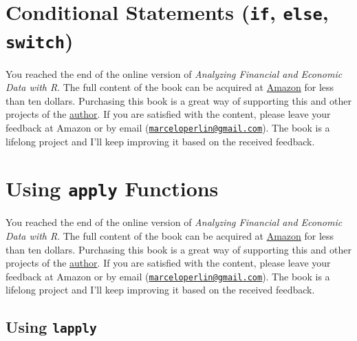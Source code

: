 \documentclass[
  12pt,
]{book}
\newenvironment{pleasebuyit}
{\begin{noteblock}
		
	} {\end{noteblock}}
\begin{document}
\hypertarget{conditional-statements-if-else-switch}{%
\section{\texorpdfstring{Conditional Statements (\texttt{if}, \texttt{else}, \texttt{switch})}{Conditional Statements (if, else, switch)}}\label{conditional-statements-if-else-switch}}

\begin{pleasebuyit}
You reached the end of the online version of \emph{Analyzing Financial
and Economic Data with R}. The full content of the book can be acquired
at \href{https://www.amazon.com/dp/B084LSNXMN}{Amazon} for less than ten
dollars. Purchasing this book is a great way of supporting this and
other projects of the \href{https://www.msperlin.com/blog/}{author}. If
you are satisfied with the content, please leave your feedback at Amazon
or by email
(\href{mailto:marceloperlin@gmail.com}{\nolinkurl{marceloperlin@gmail.com}}).
The book is a lifelong project and I'll keep improving it based on the
received feedback.
\end{pleasebuyit}

\hypertarget{using-apply-functions}{%
\section{\texorpdfstring{Using \texttt{apply} Functions}{Using apply Functions}}\label{using-apply-functions}}

\begin{pleasebuyit}
You reached the end of the online version of \emph{Analyzing Financial
and Economic Data with R}. The full content of the book can be acquired
at \href{https://www.amazon.com/dp/B084LSNXMN}{Amazon} for less than ten
dollars. Purchasing this book is a great way of supporting this and
other projects of the \href{https://www.msperlin.com/blog/}{author}. If
you are satisfied with the content, please leave your feedback at Amazon
or by email
(\href{mailto:marceloperlin@gmail.com}{\nolinkurl{marceloperlin@gmail.com}}).
The book is a lifelong project and I'll keep improving it based on the
received feedback.
\end{pleasebuyit}

\hypertarget{using-lapply}{%
\subsection{\texorpdfstring{Using \texttt{lapply}}{Using lapply}}\label{using-lapply}}
\end{document}
